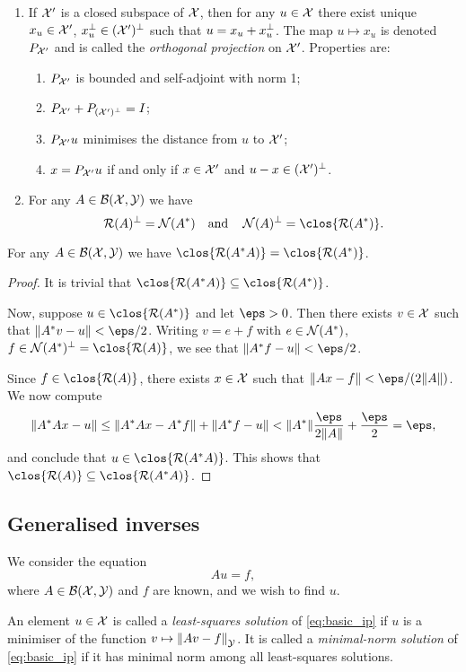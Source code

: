 \begin{recap}
\begin{enumerate}
        \item If $\XX'$ is a closed subspace of $\XX$, then for any $u \in \XX$ there exist unique $x_u \in \XX'$, $x_u\P \in (\XX')\P$ such that $u = x_u + x_u\P$. The map $u \mapsto x_u$ is denoted $P_{\XX'}$ and is called the \emph{orthogonal projection} on $\XX'$. Properties are:
        \begin{enumerate}
            \item $P_{\XX'}$ is bounded and self-adjoint with norm 1;
            \item $P_{\XX'} + P_{(\XX')\P} = I$;
            \item $P_{\XX'}u$ minimises the distance from $u$ to $\XX'$;
            \item $x = P_{\XX'}u$ if and only if $x \in \XX'$ and $u - x \in (\XX')\P$. 
        \end{enumerate}
    
    \item For any $A \in \BB(\XX, \YY)$ we have
    \[
    \Ran(A)\P = \Nul(A^*) \quad\text{and}\quad \Nul(A)\P = \clos{\Ran(A^*)}. 
    \]

     \end{enumerate}
\end{recap}

\begin{lemma}
    For any $A \in \BB(\XX, \YY)$ we have $\clos{\Ran(A^*A)} = \clos{\Ran(A^*)}$. 
\end{lemma}

\begin{proof}
    It is trivial that $\clos{\Ran(A^*A)} \subseteq \clos{\Ran(A^*)}$. 
    
    Now, suppose $u \in \clos{\Ran(A^*)}$ and let $\eps > 0$. Then there exists $v \in \XX$ such that $\norm{A^*v - u} < \eps/2$. Writing $v = e + f$ with $e \in \Nul(A^*)$, $f \in \Nul(A^*)\P = \clos{\Ran(A)}$, we see that $\norm{A^*f - u} < \eps/2$. 
    
    Since $f \in \clos{\Ran(A)}$, there exists $x \in \XX$ such that $\norm{Ax - f} < \eps/(2\norm{A})$. We now compute
    \[
    \norm{A^* A x - u} \leq \norm{A^*A x - A^* f} + \norm{A^*f - u} < \norm{A^*} \frac{\eps}{2\norm{A}} + \frac\eps2 = \eps, 
    \]
    and conclude that $u \in \clos{\Ran(A^*A)}$. This shows that $\clos{\Ran(A)} \subseteq \clos{\Ran(A^*A)}$. 
\end{proof}

\subsection{Generalised inverses}
We consider the equation \begin{equation} \label{eq:basic_ip}
    Au = f,
\end{equation} where $A \in \BB(\XX, \YY)$ and $f$ are known, and we wish to find $u$. 
\begin{definition}
    An element $u \in \XX$ is called a \emph{least-squares solution} of \cref{eq:basic_ip} if $u$ is a minimiser of the function $v \mapsto \norm{Av - f}_\YY$. It is called a \emph{minimal-norm solution} of \cref{eq:basic_ip} if it has minimal norm among all least-squares solutions. 
\end{definition}


